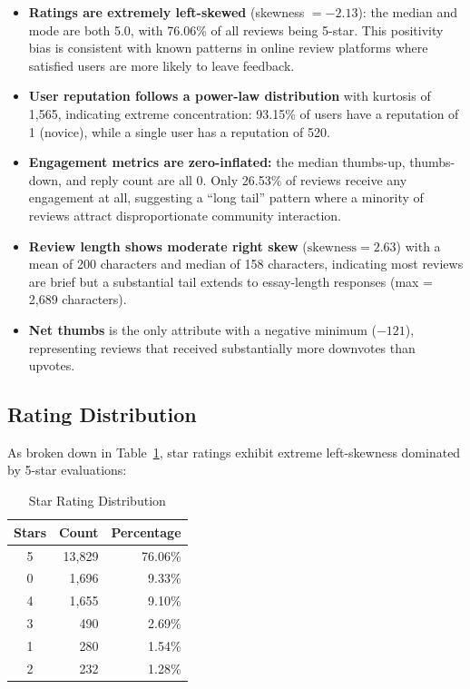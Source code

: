 \documentclass[12pt,a4paper]{article}
\begin{document}
\begin{itemize}
    \item \textbf{Ratings are extremely left-skewed} (skewness $= -2.13$): the median and mode are both 5.0, with 76.06\% of all reviews being 5-star. This positivity bias is consistent with known patterns in online review platforms where satisfied users are more likely to leave feedback.
    \item \textbf{User reputation follows a power-law distribution} with kurtosis of 1{,}565, indicating extreme concentration: 93.15\% of users have a reputation of 1 (novice), while a single user has a reputation of 520.
    \item \textbf{Engagement metrics are zero-inflated:} the median thumbs-up, thumbs-down, and reply count are all 0. Only 26.53\% of reviews receive any engagement at all, suggesting a ``long tail'' pattern where a minority of reviews attract disproportionate community interaction.
    \item \textbf{Review length shows moderate right skew} ($\text{skewness} = 2.63$) with a mean of 200 characters and median of 158 characters, indicating most reviews are brief but a substantial tail extends to essay-length responses (max = 2{,}689 characters).
    \item \textbf{Net thumbs} is the only attribute with a negative minimum ($-121$), representing reviews that received substantially more downvotes than upvotes.
\end{itemize}

\subsection{Rating Distribution}

As broken down in Table~\ref{tab:rating_dist}, star ratings exhibit extreme left-skewness dominated by 5-star evaluations:

\begin{table}[H]
\centering
\caption{Star Rating Distribution}
\label{tab:rating_dist}
\begin{tabular}{c r r}
\toprule
\textbf{Stars} & \textbf{Count} & \textbf{Percentage} \\
\midrule
5 & 13{,}829 & 76.06\% \\
0 & 1{,}696  & 9.33\% \\
4 & 1{,}655  & 9.10\% \\
3 & 490     & 2.69\% \\
1 & 280     & 1.54\% \\
2 & 232     & 1.28\% \\
\bottomrule
\end{tabular}
\end{table}
\end{document}
